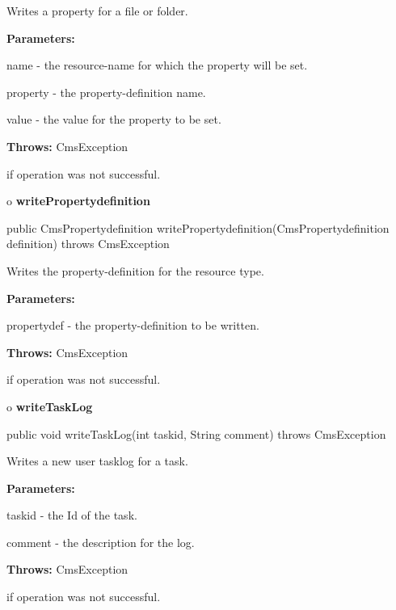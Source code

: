 \begin{description}
\htmlDD Writes a property for a file or folder. 

\begin{description}
\item {\bf Parameters:}  

name - the resource-name for which the property will be set.  

property - the property-definition name.  

value - the value for the property to be set.  
\item {\bf Throws:} CmsException  

if operation was not successful.  
\end{description}

\end{description}

o {\bf writePropertydefinition} 

\begin{PRE}
 public CmsPropertydefinition writePropertydefinition(CmsPropertydefinition definition) throws CmsException
\end{PRE}

\begin{description}
\htmlDD Writes the property-definition for the resource type. 

\begin{description}
\item {\bf Parameters:}  

propertydef - the property-definition to be written.  
\item {\bf Throws:} CmsException  

if operation was not successful.  
\end{description}

\end{description}

o {\bf writeTaskLog} 

\begin{PRE}
 public void writeTaskLog(int taskid,
                          String comment) throws CmsException
\end{PRE}

\begin{description}
\htmlDD Writes a new user tasklog for a task. 

\begin{description}
\item {\bf Parameters:}  

taskid - the Id of the task.  

comment - the description for the log.  
\item {\bf Throws:} CmsException  

if operation was not successful.  
\end{description}

\end{description}

